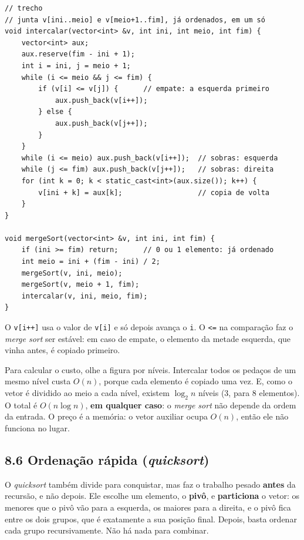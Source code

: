 \begin{codigo}
\begin{Verbatim}[breaklines=true, breaksymbolleft={}, fontsize=\footnotesize]
// trecho
// junta v[ini..meio] e v[meio+1..fim], já ordenados, em um só
void intercalar(vector<int> &v, int ini, int meio, int fim) {
    vector<int> aux;
    aux.reserve(fim - ini + 1);
    int i = ini, j = meio + 1;
    while (i <= meio && j <= fim) {
        if (v[i] <= v[j]) {      // empate: a esquerda primeiro
            aux.push_back(v[i++]);
        } else {
            aux.push_back(v[j++]);
        }
    }
    while (i <= meio) aux.push_back(v[i++]);  // sobras: esquerda
    while (j <= fim) aux.push_back(v[j++]);   // sobras: direita
    for (int k = 0; k < static_cast<int>(aux.size()); k++) {
        v[ini + k] = aux[k];                  // copia de volta
    }
}

void mergeSort(vector<int> &v, int ini, int fim) {
    if (ini >= fim) return;      // 0 ou 1 elemento: já ordenado
    int meio = ini + (fim - ini) / 2;
    mergeSort(v, ini, meio);
    mergeSort(v, meio + 1, fim);
    intercalar(v, ini, meio, fim);
}
\end{Verbatim}
\end{codigo}

O \texttt{v[i++]} usa o valor de \texttt{v[i]} e só depois avança o \texttt{i}. O \texttt{<=} na comparação faz o \textit{merge sort} ser estável: em caso de empate, o elemento da metade esquerda, que vinha antes, é copiado primeiro.

Para calcular o custo, olhe a figura por níveis. Intercalar todos os pedaços de um mesmo nível custa $O(n)$, porque cada elemento é copiado uma vez. E, como o vetor é dividido ao meio a cada nível, existem $\log_2 n$ níveis (3, para 8 elementos). O total é $O(n \log n)$, \textbf{em qualquer caso}: o \textit{merge sort} não depende da ordem da entrada. O preço é a memória: o vetor auxiliar ocupa $O(n)$, então ele não funciona no lugar.

\subsection{8.6 Ordenação rápida (\textit{quicksort})}

O \textit{quicksort} também divide para conquistar, mas faz o trabalho pesado \textbf{antes} da recursão, e não depois. Ele escolhe um elemento, o \textbf{pivô}, e \textbf{particiona} o vetor: os menores que o pivô vão para a esquerda, os maiores para a direita, e o pivô fica entre os dois grupos, que é exatamente a sua posição final. Depois, basta ordenar cada grupo recursivamente. Não há nada para combinar.


